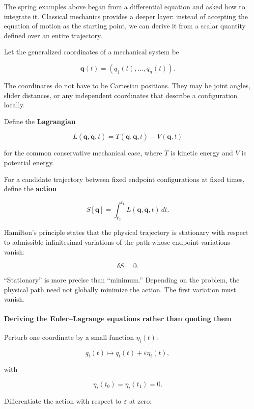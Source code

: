 The spring examples above began from a differential equation and asked how to integrate it. Classical mechanics provides a deeper layer: instead of accepting the equation of motion as the starting point, we can derive it from a scalar quantity defined over an entire trajectory.

Let the generalized coordinates of a mechanical system be

\[
\mathbf q(t)
=
(q_1(t),\ldots,q_n(t)).
\]

The coordinates do not have to be Cartesian positions. They may be joint angles, slider distances, or any independent coordinates that describe a configuration locally.

Define the \textbf{Lagrangian}

\[
\boxed{
L(\mathbf q,\dot{\mathbf q},t)
=
T(\mathbf q,\dot{\mathbf q},t)
-
V(\mathbf q,t)
}
\]

for the common conservative mechanical case, where \(T\) is kinetic energy and \(V\) is potential energy.

For a candidate trajectory between fixed endpoint configurations at fixed times, define the \textbf{action}

\[
\boxed{
S[\mathbf q]
=
\int_{t_0}^{t_1}
L(\mathbf q,\dot{\mathbf q},t)\,dt
}.
\]

Hamilton's principle states that the physical trajectory is stationary with respect to admissible infinitesimal variations of the path whose endpoint variations vanish:

\[
\delta S=0.
\]

``Stationary'' is more precise than ``minimum.'' Depending on the problem, the physical path need not globally minimize the action. The first variation must vanish.

\paragraph{Deriving the Euler--Lagrange equations rather than quoting them}\label{02-foundations-ii-ch025-deriving-the-eulerlagrange-equations-rather-than-quoting-them}

Perturb one coordinate by a small function \(\eta_i(t)\):

\[
q_i(t)\mapsto q_i(t)+\varepsilon\eta_i(t),
\]

with

\[
\eta_i(t_0)=\eta_i(t_1)=0.
\]

Differentiate the action with respect to \(\varepsilon\) at zero:

